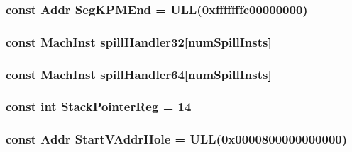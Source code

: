 \label{namespaceSparcISA_a1b6320d4c0e7fb8b5cf9f28cef6681e0}
\hypertarget{namespaceSparcISA_a63fc50b3e99f87e3eb05f5a8bd473ea4}{
\subsubsection[{SegKPMEnd}]{\setlength{\rightskip}{0pt plus 5cm}const {\bf Addr} {\bf SegKPMEnd} = ULL(0xfffffffc00000000)}}
\label{namespaceSparcISA_a63fc50b3e99f87e3eb05f5a8bd473ea4}
\hypertarget{namespaceSparcISA_a37105350a4e231a7132e2b7e18c52ce0}{
\subsubsection[{spillHandler32}]{\setlength{\rightskip}{0pt plus 5cm}const {\bf MachInst} {\bf spillHandler32}\mbox{[}{\bf numSpillInsts}\mbox{]}}}
\label{namespaceSparcISA_a37105350a4e231a7132e2b7e18c52ce0}
\hypertarget{namespaceSparcISA_a2ac6be3d632ad25c90e12c201bf1d1d1}{
\subsubsection[{spillHandler64}]{\setlength{\rightskip}{0pt plus 5cm}const {\bf MachInst} {\bf spillHandler64}\mbox{[}{\bf numSpillInsts}\mbox{]}}}
\label{namespaceSparcISA_a2ac6be3d632ad25c90e12c201bf1d1d1}
\hypertarget{namespaceSparcISA_a95d0846360ad0e64cb42fda7268a6434}{
\subsubsection[{StackPointerReg}]{\setlength{\rightskip}{0pt plus 5cm}const int {\bf StackPointerReg} = 14}}
\label{namespaceSparcISA_a95d0846360ad0e64cb42fda7268a6434}
\hypertarget{namespaceSparcISA_ab232c3f77d12da8f20157152adc977bd}{
\subsubsection[{StartVAddrHole}]{\setlength{\rightskip}{0pt plus 5cm}const {\bf Addr} {\bf StartVAddrHole} = ULL(0x0000800000000000)}}
